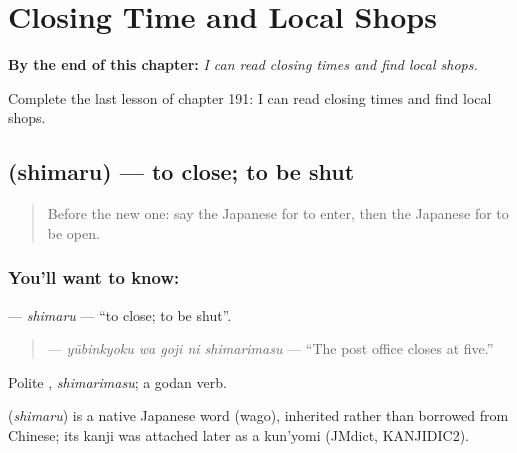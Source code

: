 
\chapter{Closing Time and Local Shops}
\label{ch:ja-closing-time-and-local-shops}

\begin{chapteropening}
\textbf{By the end of this chapter:} \emph{I can read closing times and find local shops.}

Complete the last lesson of chapter 191: I can read closing times and find local shops.
\end{chapteropening}

\section[\texorpdfstring{\ja{しまる} (shimaru)}{しまる (shimaru)}]{ (shimaru) — to close; to be shut}

\label{lesson:JA-C191-shimaru}



\begin{quote}
Before the new one: say the Japanese for to enter, then the Japanese for to be open.
\end{quote}

\subsection*{You'll want to know: }
\textbf{} — \emph{shimaru} — \textquotedblleft{}to close; to be shut\textquotedblright{}.

\begin{quote}
\textbf{  } — \emph{yūbinkyoku wa goji ni shimarimasu} — \textquotedblleft{}The post office closes at five.\textquotedblright{}
\end{quote}

Polite \textbf{}, \emph{shimarimasu}; a godan verb.

\begin{cousinweb}
\textbf{} (\emph{shimaru}) is a native Japanese word (wago), inherited rather than borrowed from Chinese; its kanji was attached later as a kun'yomi (JMdict, KANJIDIC2).
\end{cousinweb}

